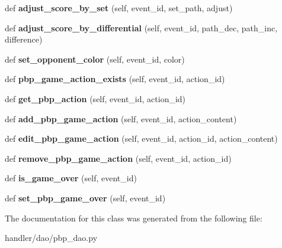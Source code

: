 \begin{DoxyCompactItemize}
def {\bfseries adjust\+\_\+score\+\_\+by\+\_\+set} (self, event\+\_\+id, set\+\_\+path, adjust)
\item 
\mbox{\label{classhandler_1_1dao_1_1pbp__dao_1_1_p_b_p_dao_a95ea3aaec740ccbb4fb5d5c07b0439e0}} 
def {\bfseries adjust\+\_\+score\+\_\+by\+\_\+differential} (self, event\+\_\+id, path\+\_\+dec, path\+\_\+inc, difference)
\item 
\mbox{\label{classhandler_1_1dao_1_1pbp__dao_1_1_p_b_p_dao_a46a33bcdaf5e87326884d2f05d3280a8}} 
def {\bfseries set\+\_\+opponent\+\_\+color} (self, event\+\_\+id, color)
\item 
\mbox{\label{classhandler_1_1dao_1_1pbp__dao_1_1_p_b_p_dao_a8fba96941656e377125457deb83140d6}} 
def {\bfseries pbp\+\_\+game\+\_\+action\+\_\+exists} (self, event\+\_\+id, action\+\_\+id)
\item 
\mbox{\label{classhandler_1_1dao_1_1pbp__dao_1_1_p_b_p_dao_ab64fb33991baf49a73cc8a5180b8b74e}} 
def {\bfseries get\+\_\+pbp\+\_\+action} (self, event\+\_\+id, action\+\_\+id)
\item 
\mbox{\label{classhandler_1_1dao_1_1pbp__dao_1_1_p_b_p_dao_a7faa4be8c78c01da5c4abc9a2bf97a0b}} 
def {\bfseries add\+\_\+pbp\+\_\+game\+\_\+action} (self, event\+\_\+id, action\+\_\+content)
\item 
\mbox{\label{classhandler_1_1dao_1_1pbp__dao_1_1_p_b_p_dao_a8b192ac72466e526e818299c691eb114}} 
def {\bfseries edit\+\_\+pbp\+\_\+game\+\_\+action} (self, event\+\_\+id, action\+\_\+id, action\+\_\+content)
\item 
\mbox{\label{classhandler_1_1dao_1_1pbp__dao_1_1_p_b_p_dao_acfab7336b3367e17ca6a987434f095cf}} 
def {\bfseries remove\+\_\+pbp\+\_\+game\+\_\+action} (self, event\+\_\+id, action\+\_\+id)
\item 
\mbox{\label{classhandler_1_1dao_1_1pbp__dao_1_1_p_b_p_dao_a402928f0a55ebe2f1295e0b6dac76123}} 
def {\bfseries is\+\_\+game\+\_\+over} (self, event\+\_\+id)
\item 
\mbox{\label{classhandler_1_1dao_1_1pbp__dao_1_1_p_b_p_dao_a02048c0945e96af5c39c556f8786c8ce}} 
def {\bfseries set\+\_\+pbp\+\_\+game\+\_\+over} (self, event\+\_\+id)
\end{DoxyCompactItemize}


The documentation for this class was generated from the following file\+:\begin{DoxyCompactItemize}
\item 
handler/dao/pbp\+\_\+dao.\+py\end{DoxyCompactItemize}
